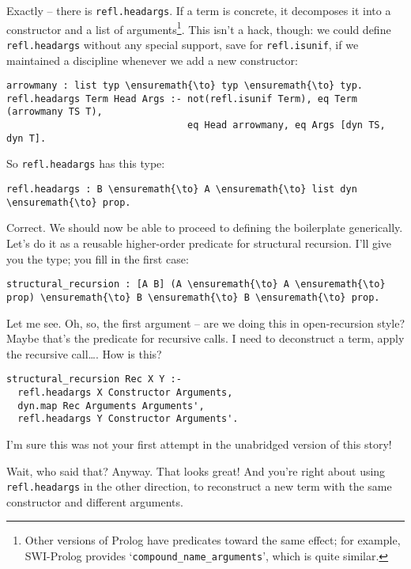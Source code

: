 \heroADVISOR{} Exactly -- there is \texttt{refl.headargs}. If a term is
concrete, it decomposes it into a constructor and a list of
arguments\footnote{Other versions of Prolog have predicates toward the same effect; for example, SWI-Prolog \citep{wielemaker2012swi} provides `\texttt{compound\_{}name\_{}arguments}', which is quite similar.}.
This isn't a hack, though: we could define \texttt{refl.headargs}
without any special support, save for \texttt{refl.isunif}, if we
maintained a discipline whenever we add a new constructor:

\begin{verbatim}
arrowmany : list typ \ensuremath{\to} typ \ensuremath{\to} typ.
refl.headargs Term Head Args :- not(refl.isunif Term), eq Term (arrowmany TS T),
                                eq Head arrowmany, eq Args [dyn TS, dyn T].
\end{verbatim}

\heroSTUDENT{} So \texttt{refl.headargs} has this type:

\begin{verbatim}
refl.headargs : B \ensuremath{\to} A \ensuremath{\to} list dyn \ensuremath{\to} prop.
\end{verbatim}

\heroADVISOR{} Correct. We should now be able to proceed to defining the
boilerplate generically. Let's do it as a reusable higher-order
predicate for structural recursion. I'll give you the type; you fill in
the first case:

\begin{verbatim}
structural_recursion : [A B] (A \ensuremath{\to} A \ensuremath{\to} prop) \ensuremath{\to} B \ensuremath{\to} B \ensuremath{\to} prop.
\end{verbatim}

\heroSTUDENT{} Let me see. Oh, so, the first argument -- are we doing this in
open-recursion style? Maybe that's the predicate for recursive calls. I
need to deconstruct a term, apply the recursive call\ldots{}. How is
this?

\begin{verbatim}
structural_recursion Rec X Y :-
  refl.headargs X Constructor Arguments,
  dyn.map Rec Arguments Arguments',
  refl.headargs Y Constructor Arguments'.
\end{verbatim}

\heroAUDIENCE{} I'm sure this was not your first attempt in the unabridged
version of this story!

\heroADVISOR{} Wait, who said that? Anyway. That looks great! And you're right
about using \texttt{refl.headargs} in the other direction, to
reconstruct a new term with the same constructor and different
arguments.

